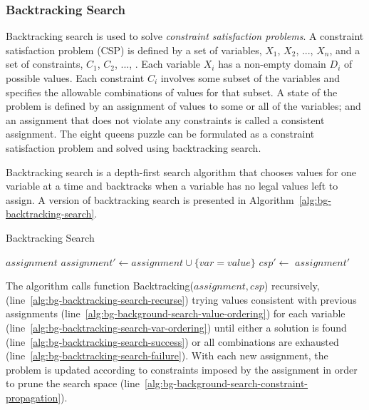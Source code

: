\subsubsection{Backtracking Search}
\label{sec:bg-backtracking-search}

Backtracking search is used to solve {\em constraint satisfaction
problems}. A constraint satisfaction problem (CSP) is defined by a set
of variables, $X_1$, $X_2$, ..., $X_n$, and a set of constraints,
$C_1$, $C_2$, ..., . Each variable $X_i$ has a non-empty domain
$D_i$ of possible values. Each constraint $C_i$ involves some subset
of the variables and specifies the allowable combinations of values
for that subset. A state of the problem is defined by an assignment of
values to some or all of the variables; and an assignment that does
not violate any constraints is called a consistent assignment. The eight
queens puzzle can be formulated as a constraint satisfaction problem
and solved using backtracking search.

Backtracking search is a depth-first search algorithm that chooses
values for one variable at a time and backtracks when a variable has
no legal values left to assign. A version of backtracking search is
presented in Algorithm~\ref{alg:bg-backtracking-search}.
\begin{algorithm}
\caption{Backtracking Search}
\label{alg:bg-backtracking-search}
\begin{algorithmic}[1]
   \Return $assignment$
\EndIf
{} \label{alg:bg-backtracking-search-var-ordering}
 \label{alg:bg-background-search-value-ordering}
  \State $assignment' \leftarrow assignment \cup \{var=value\}$
  \State $csp' \leftarrow $ \label{alg:bg-background-search-constraint-propagation}
   \label{alg:bg-backtracking-search-recurse}
     \State \Return $assignment'$ \label{alg:bg-backtracking-search-success}
  \EndIf
\EndFor
\State {} \label{alg:bg-backtracking-search-failure}
\EndProcedure
\end{algorithmic}
\end{algorithm}
The algorithm calls function {\sc Backtracking}($assignment, csp$)
recursively, (line~\ref{alg:bg-backtracking-search-recurse})
trying values consistent with previous assignments
(line~\ref{alg:bg-background-search-value-ordering})
for each variable
(line~\ref{alg:bg-backtracking-search-var-ordering})
until either a solution is found
(line~\ref{alg:bg-backtracking-search-success}) or all combinations
are exhausted (line~\ref{alg:bg-backtracking-search-failure}). With
each new assignment, the problem is updated according to constraints
imposed by the assignment in order to prune the search space (line~\ref{alg:bg-background-search-constraint-propagation}).


